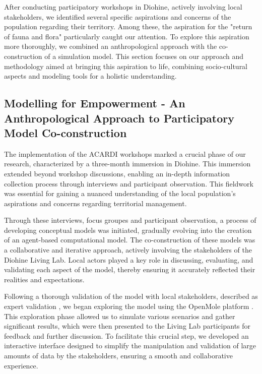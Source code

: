 \documentclass{article}
\begin{document}
After conducting participatory workshops in Diohine, actively involving local stakeholders, we identified several specific aspirations and concerns of the population regarding their territory. Among these, the aspiration for the "return of fauna and flora" particularly caught our attention. To explore this aspiration more thoroughly, we combined an anthropological approach with the co-construction of a simulation model. This section focuses on our approach and methodology aimed at bringing this aspiration to life, combining socio-cultural aspects and modeling tools for a holistic understanding.

\subsection{Modelling for Empowerment - An Anthropological Approach to Participatory Model Co-construction}

The implementation of the ACARDI workshops marked a crucial phase of our research, characterized by a three-month immersion in Diohine. This immersion extended beyond workshop discussions, enabling an in-depth information collection process through interviews and participant observation. This fieldwork was essential for gaining a nuanced understanding of the local population's aspirations and concerns regarding territorial management.

Through these interviews, focus groupes and participant observation, a process of developing conceptual models was initiated, gradually evolving into the creation of an agent-based computational model. The co-construction of these models was a collaborative and iterative approach, actively involving the stakeholders of the Diohine Living Lab. Local actors played a key role in discussing, evaluating, and validating each aspect of the model, thereby ensuring it accurately reflected their realities and expectations.

Following a thorough validation of the model with local stakeholders, described as expert validation \parencite{bommel_definition_2009}, we began exploring the model using the OpenMole platform \parencite{reuillon_openmole_2013}. This exploration phase allowed us to simulate various scenarios and gather significant results, which were then presented to the Living Lab participants for feedback and further discussion. To facilitate this crucial step, we developed an interactive interface designed to simplify the manipulation and validation of large amounts of data by the stakeholders, ensuring a smooth and collaborative experience.
\end{document}
